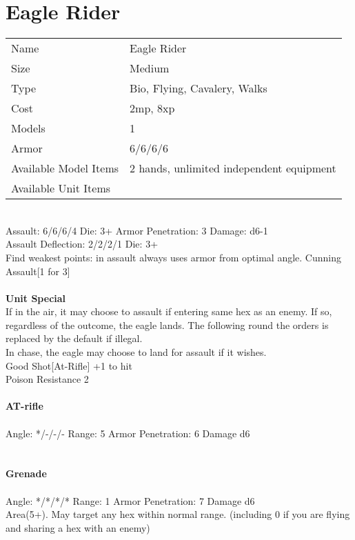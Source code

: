 






\pagebreak

\section{ Eagle Rider }

\begin{tabular}{ll}
  Name & Eagle Rider \\
  Size & Medium\\
  Type & Bio, Flying, Cavalery, Walks\\
  Cost & 2mp, 8xp\\
  Models & 1\\
  Armor & 6/6/6/6\\
  Available Model Items & 2 hands, unlimited independent equipment \\
  Available Unit Items &  \\
\end{tabular}

\ \\
Assault: 6/6/6/4 Die: 3+ Armor Penetration: 3 Damage: d6-1 \\
Assault Deflection: 2/2/2/1 Die: 3+\\
\indent Find weakest points: in assault always uses armor from optimal angle. Cunning Assault[1 for 3] \\
\ \\

{\bf Unit Special} \\
If in the air, it may choose to assault if entering same hex as an enemy. If so, regardless of the outcome, the eagle lands. The following round the orders is replaced by the default if illegal. \\ In chase, the eagle may choose to land for assault if it wishes. \\ Good Shot[At-Rifle] +1 to hit\\ Poison Resistance 2
\ \\
\ \\
{\bf AT-rifle } \\
\ \\
Angle: */-/-/- Range: 5 Armor Penetration: 6 Damage d6 \\
\indent  \\



\ \\
{\bf Grenade } \\
\ \\
Angle: */*/*/* Range: 1 Armor Penetration: 7 Damage d6 \\
\indent Area(5+). May target any hex within normal range. (including 0 if you are flying and sharing a hex with an enemy) \\





